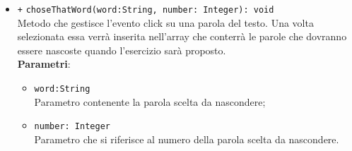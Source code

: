 \begin{itemize}
\begin{itemize}
		\item \texttt{+} \texttt{choseThatWord(word:String, number: Integer): void}\\
		Metodo che gestisce l’evento click su una parola del testo. Una volta selezionata essa verrà inserita nell'array che conterrà le parole che dovranno essere nascoste quando l'esercizio sarà proposto. \\
		\textbf{Parametri}:
		\begin{itemize}
			\item \texttt{word:String} \\
			Parametro contenente la parola scelta da nascondere;
			\item \texttt{number: Integer} \\ 
			Parametro che si riferisce al numero della parola scelta da nascondere.
		\end{itemize}
	\end{itemize}
\end{itemize}

